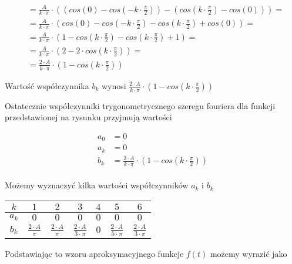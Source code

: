\begin{task}
\begin{align*}
&=\frac{A}{k \cdot \pi} \cdot \left(\left( cos\left(0 \right) - cos\left(- k \cdot \frac{\pi}{2} \right) \right) - \left( cos\left( k \cdot \frac{\pi}{2} \right) - cos\left( 0 \right) \right) \right)=\\
&=\frac{A}{k \cdot \pi} \cdot \left( cos\left(0 \right) - cos\left(- k \cdot \frac{\pi}{2} \right) - cos\left( k \cdot \frac{\pi}{2} \right) + cos\left( 0 \right) \right)=\\
&=\frac{A}{k \cdot \pi} \cdot \left( 1 - cos\left( k \cdot \frac{\pi}{2} \right) - cos\left( k \cdot \frac{\pi}{2} \right) + 1 \right)=\\
&=\frac{A}{k \cdot \pi} \cdot \left( 2 - 2 \cdot cos\left(k \cdot \frac{\pi}{2} \right) \right)=\\
&=\frac{2 \cdot A}{k \cdot \pi} \cdot \left( 1 - cos\left(k \cdot \frac{\pi}{2} \right) \right)
\end{align*}

Wartość współczynnika $b_k$ wynosi $\frac{2 \cdot A}{k \cdot \pi} \cdot \left( 1 - cos\left(k \cdot \frac{\pi}{2} \right) \right)$


Ostatecznie współczynniki trygonometrycznego szeregu fouriera dla funkcji przedstawionej na rysunku przyjmują wartości

\begin{align*}
a_0&=0\\
a_k&=0\\
b_k&=\frac{2 \cdot A}{k \cdot \pi} \cdot \left( 1 - cos\left(k \cdot \frac{\pi}{2} \right) \right)\\
\end{align*}

Możemy wyznaczyć kilka wartości współczynników $a_k$ i $b_k$

\begin{table}[H]
\centering  
\begin{tabular}{|c|c|c|c|c|c|c|}
  \hline 
  $k$ & $1$ & $2$ & $3$ & $4$ & $5$ & $6$\\ 
  \hline 
  $a_k$ & $0$ & $0$ & $0$ & $0$ & $0$ & $0$\\ 
  \hline 
  $b_k$ & $\frac{2\cdot A}{\pi}$ & $\frac{2\cdot A}{\pi}$ & $\frac{2\cdot A}{3 \cdot \pi}$ & $0$ & $\frac{2\cdot A}{5 \cdot \pi}$ & $\frac{2\cdot A}{3 \cdot \pi}$ \\ 
  \hline 
\end{tabular} 
\end{table}

Podstawiając to wzoru aproksymacyjnego funkcje $f(t)$ możemy wyrazić jako


\end{task}
